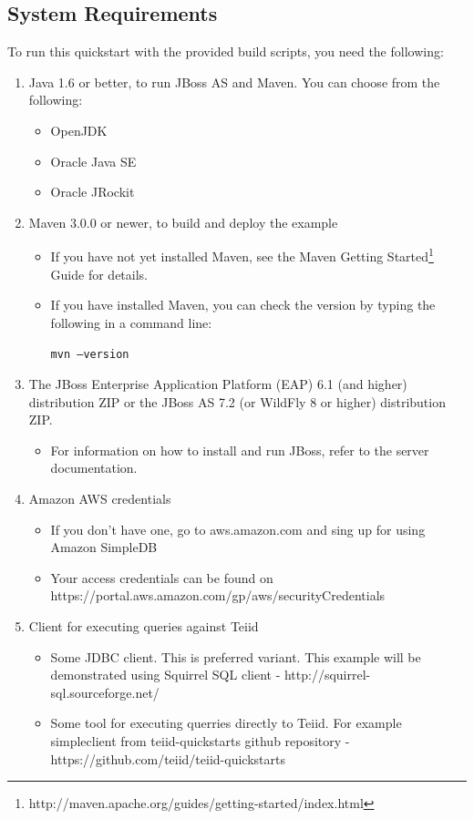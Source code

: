 \documentclass[oneside,12pt]{fithesis2}
\begin{document}
\subsection*{System Requirements}
To run this quickstart with the provided build scripts, you need the following:
\begin{enumerate}
 \item Java 1.6 or better, to run JBoss AS and Maven. You can choose from the following:
 \begin{itemize}
  \item OpenJDK
  \item Oracle Java SE
  \item Oracle JRockit
 \end{itemize}

 \item Maven 3.0.0 or newer, to build and deploy the example
 \begin{itemize}
  \item If you have not yet installed Maven, see the Maven Getting Started\footnote{http://maven.apache.org/guides/getting-started/index.html} Guide for details.
  \item If you have installed Maven, you can check the version by typing the following in a command line:

  \texttt{mvn --version}
 \end{itemize}
 
 \item The JBoss Enterprise Application Platform (EAP) 6.1 (and higher) distribution ZIP or the JBoss AS 7.2 (or WildFly 8 or higher) distribution ZIP.
 \begin{itemize}
  \item For information on how to install and run JBoss, refer to the server documentation.
 \end{itemize}

 \item Amazon AWS credentials
 \begin{itemize}
  \item If you don't have one, go to aws.amazon.com and sing up for using Amazon SimpleDB
  \item Your access credentials can be found on https://portal.aws\allowbreak .amazon.com/gp/aws/securityCredentials
 \end{itemize}

 \item Client for executing queries against Teiid
 \begin{itemize}
  \item Some JDBC client. This is preferred variant. This example will be demonstrated using Squirrel SQL client - http://squirrel-sql.sourceforge.net/
  \item Some tool for executing querries directly to Teiid. For example simpleclient from teiid-quickstarts github repository - https://github.com/teiid/teiid-quickstarts
 \end{itemize}
\end{enumerate}
\end{document}

